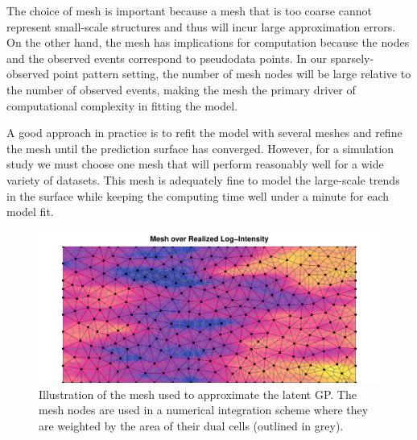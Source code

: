 \documentclass[review]{elsarticle}
\begin{document}
The choice of mesh is important because a mesh that is too coarse cannot
represent small-scale structures and thus will incur large approximation
errors. On the other hand, the mesh has implications for computation because
the nodes and the observed events correspond to pseudodata points. In our
sparsely-observed point pattern setting, the number of mesh nodes will be
large relative to the number of observed events, making the mesh the primary
driver of computational complexity in fitting the model.

A good approach in practice is to refit the model with several meshes and
refine the mesh until the prediction surface has converged. However, for a
simulation study we must choose one mesh that will perform reasonably well for
a wide variety of datasets. This mesh is adequately fine to model the
large-scale trends in the surface while keeping the computing time well under
a minute for each model fit.

\begin{figure}
\includegraphics[width=5in]{../graphics/mesh-LGCP000004.pdf}
\caption{Illustration of the mesh used to approximate the latent GP. The mesh
nodes are used in a numerical integration scheme where they are weighted by the
area of their dual cells (outlined in grey).}
\label{meshfull}
\end{figure}


\end{document}
